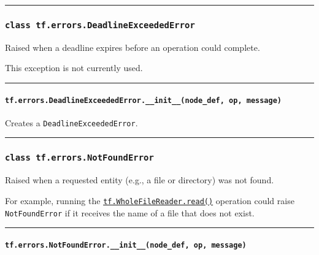 \begin{center}\rule{0.5\linewidth}{\linethickness}\end{center}

\subsubsection{\texorpdfstring{\texttt{class\ tf.errors.DeadlineExceededError}
}{class tf.errors.DeadlineExceededError }}\label{class-tf.errors.deadlineexceedederror}

Raised when a deadline expires before an operation could complete.

This exception is not currently used.

\begin{center}\rule{0.5\linewidth}{\linethickness}\end{center}

\paragraph{\texorpdfstring{\texttt{tf.errors.DeadlineExceededError.\_\_init\_\_(node\_def,\ op,\ message)}
}{tf.errors.DeadlineExceededError.\_\_init\_\_(node\_def, op, message) }}\label{tf.errors.deadlineexceedederror.ux5fux5finitux5fux5fnodeux5fdef-op-message}

Creates a \texttt{DeadlineExceededError}.

\begin{center}\rule{0.5\linewidth}{\linethickness}\end{center}

\subsubsection{\texorpdfstring{\texttt{class\ tf.errors.NotFoundError}
}{class tf.errors.NotFoundError }}\label{class-tf.errors.notfounderror}

Raised when a requested entity (e.g., a file or directory) was not
found.

For example, running the
\href{../../api_docs/python/io_ops.md\#WholeFileReader}{\texttt{tf.WholeFileReader.read()}}
operation could raise \texttt{NotFoundError} if it receives the name of
a file that does not exist.

\begin{center}\rule{0.5\linewidth}{\linethickness}\end{center}

\paragraph{\texorpdfstring{\texttt{tf.errors.NotFoundError.\_\_init\_\_(node\_def,\ op,\ message)}
}{tf.errors.NotFoundError.\_\_init\_\_(node\_def, op, message) }}\label{tf.errors.notfounderror.ux5fux5finitux5fux5fnodeux5fdef-op-message}

